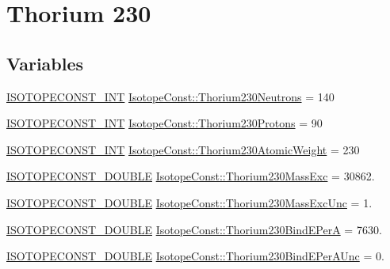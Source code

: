 \hypertarget{group___isotope_const-_thorium-_th230}{}\section{Thorium 230}
\label{group___isotope_const-_thorium-_th230}
\subsection*{Variables}
\begin{DoxyCompactItemize}
\item 
\mbox{\hyperlink{group___isotope_const-_macros_ga5f18360b3e99483a35c32d789e62621c}{I\+S\+O\+T\+O\+P\+E\+C\+O\+N\+S\+T\+\_\+\+I\+NT}} \mbox{\hyperlink{group___isotope_const-_thorium-_th230_ga2f79a60ab982e5b036e8f25e7d3a7c8c}{Isotope\+Const\+::\+Thorium230\+Neutrons}} = 140
\item 
\mbox{\hyperlink{group___isotope_const-_macros_ga5f18360b3e99483a35c32d789e62621c}{I\+S\+O\+T\+O\+P\+E\+C\+O\+N\+S\+T\+\_\+\+I\+NT}} \mbox{\hyperlink{group___isotope_const-_thorium-_th230_ga3c454187732d7edfd9bd49887594147e}{Isotope\+Const\+::\+Thorium230\+Protons}} = 90
\item 
\mbox{\hyperlink{group___isotope_const-_macros_ga5f18360b3e99483a35c32d789e62621c}{I\+S\+O\+T\+O\+P\+E\+C\+O\+N\+S\+T\+\_\+\+I\+NT}} \mbox{\hyperlink{group___isotope_const-_thorium-_th230_ga082ae70616e349008cbc434e51bc07d1}{Isotope\+Const\+::\+Thorium230\+Atomic\+Weight}} = 230
\item 
\mbox{\hyperlink{group___isotope_const-_macros_ga8f45a7272ce02c0b4c65c44636ed719a}{I\+S\+O\+T\+O\+P\+E\+C\+O\+N\+S\+T\+\_\+\+D\+O\+U\+B\+LE}} \mbox{\hyperlink{group___isotope_const-_thorium-_th230_ga6291f6c28c7ed9fc7cadefb3e54ed75a}{Isotope\+Const\+::\+Thorium230\+Mass\+Exc}} = 30862.
\item 
\mbox{\hyperlink{group___isotope_const-_macros_ga8f45a7272ce02c0b4c65c44636ed719a}{I\+S\+O\+T\+O\+P\+E\+C\+O\+N\+S\+T\+\_\+\+D\+O\+U\+B\+LE}} \mbox{\hyperlink{group___isotope_const-_thorium-_th230_ga76b9a3be026e242a70796acb10e1c352}{Isotope\+Const\+::\+Thorium230\+Mass\+Exc\+Unc}} = 1.
\item 
\mbox{\hyperlink{group___isotope_const-_macros_ga8f45a7272ce02c0b4c65c44636ed719a}{I\+S\+O\+T\+O\+P\+E\+C\+O\+N\+S\+T\+\_\+\+D\+O\+U\+B\+LE}} \mbox{\hyperlink{group___isotope_const-_thorium-_th230_gaa48d9c6b1474d6f4f76bcbff5f50eeda}{Isotope\+Const\+::\+Thorium230\+Bind\+E\+PerA}} = 7630.
\item 
\mbox{\hyperlink{group___isotope_const-_macros_ga8f45a7272ce02c0b4c65c44636ed719a}{I\+S\+O\+T\+O\+P\+E\+C\+O\+N\+S\+T\+\_\+\+D\+O\+U\+B\+LE}} \mbox{\hyperlink{group___isotope_const-_thorium-_th230_gaf7b762b05e90993064278d39c4062285}{Isotope\+Const\+::\+Thorium230\+Bind\+E\+Per\+A\+Unc}} = 0.

\end{DoxyCompactItemize}
